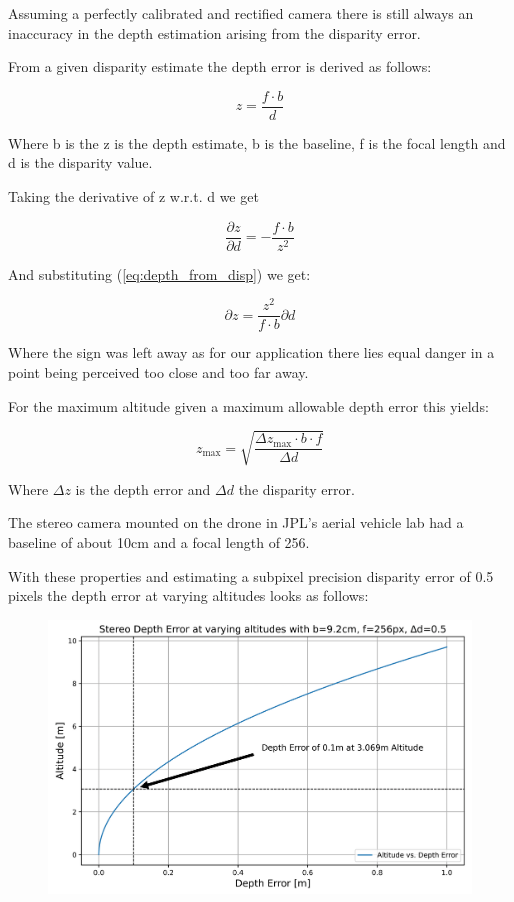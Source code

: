 Assuming a perfectly calibrated and rectified camera there is still always an inaccuracy in the depth estimation arising from the disparity error.

From a given disparity estimate the depth error is derived as follows:

\begin{equation}\label{eq:depth_from_disp}
    z = \frac{f \cdot b}{d}
\end{equation}

Where b is the z is the depth estimate, b is the baseline, f is the focal length and d is the disparity value.

Taking the derivative of z w.r.t. d we get

\begin{equation}
    \frac{\partial z}{\partial d} = - \frac{f  \cdot b}{z^2}
\end{equation}

And substituting (\cref{eq:depth_from_disp}) we get:

\begin{equation}
    {\partial z} = \frac{z^2}{f  \cdot b}\partial d
\end{equation}

Where the sign was left away as for our application there lies equal danger in a point being perceived too close and too far away.

For the maximum altitude given a maximum allowable depth error this yields:

\begin{equation}
    z_{\text{max}} = \sqrt{\frac{\Delta z_{\text{max}} \cdot b \cdot f}{\Delta d}}
\end{equation}

Where $\Delta z$ is the depth error and $\Delta d$ the disparity error.

The stereo camera mounted on the drone in JPL's aerial vehicle lab had a baseline of about 10cm and a focal length of 256.

With these properties and estimating a subpixel precision disparity error of 0.5 pixels the depth error at varying altitudes looks as follows:

\begin{figure}
    \centering
    \includegraphics[scale=0.19]{images/preparation/stereo_limit.png}
    \label{fig:stereo_limit}
\end{figure}

